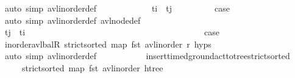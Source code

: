 \begin{isabellebody}
\ {\isacharparenleft}{\kern0pt}auto\ simp{\isacharcolon}{\kern0pt}\ avl{\isacharunderscore}{\kern0pt}inorder{\isacharunderscore}{\kern0pt}def{\isacharparenright}{\kern0pt}\isanewline
\ \ \ \ \isamarkupfalse%
\isanewline
\ \ \ \ \ \ \isamarkupfalse%
\ {\isachardoublequoteopen}t\isactrlsub i\ {\isacharequal}{\kern0pt}\ t\isactrlsub j{\isachardoublequoteclose}\isanewline
\ \ \ \ \ \ \isamarkupfalse%
\ \isamarkupfalse%
\ {\isacharquery}{\kern0pt}case\isanewline
\ \ \ \ \ \ \ \ \isamarkupfalse%
\ {\isacharparenleft}{\kern0pt}auto\ simp{\isacharcolon}{\kern0pt}\ avl{\isacharunderscore}{\kern0pt}inorder{\isacharunderscore}{\kern0pt}def\ avl{\isacharunderscore}{\kern0pt}node{\isacharunderscore}{\kern0pt}def{\isacharparenright}{\kern0pt}\isanewline
\ \ \ \ \isamarkupfalse%
\isanewline
\ \ \ \ \ \ \isamarkupfalse%
\ {\isachardoublequoteopen}t\isactrlsub j\ {\isacharless}{\kern0pt}\ t\isactrlsub i{\isachardoublequoteclose}\ \ \ \ \ \ \ \ \ \ \ \ \ \ \ \ \ \ \ \ \ \ \ \ \ \ \ \ \ \ \ \ \isanewline
\ \ \ \ \ \ \isamarkupfalse%
\ \isamarkupfalse%
\ {\isacharquery}{\kern0pt}case\isanewline
\ \ \ \ \ \ \ \ \isamarkupfalse%
\ inorder{\isacharunderscore}{\kern0pt}avl{\isacharunderscore}{\kern0pt}balR\ {\isacartoucheopen}strict{\isacharunderscore}{\kern0pt}sorted\ {\isacharparenleft}{\kern0pt}map\ fst\ {\isacharparenleft}{\kern0pt}avl{\isacharunderscore}{\kern0pt}inorder\ r{\isacharparenright}{\kern0pt}{\isacharparenright}{\kern0pt}{\isacartoucheclose}\ {\isachardoublequoteopen}{}{\isachardot}{\kern0pt}hyps{\isachardoublequoteclose}\ \isamarkupfalse%
\ {\isacharparenleft}{\kern0pt}auto\ simp{\isacharcolon}{\kern0pt}\ avl{\isacharunderscore}{\kern0pt}inorder{\isacharunderscore}{\kern0pt}def{\isacharparenright}{\kern0pt}\isanewline
\ \ \ \ \isamarkupfalse%
\isanewline
\ \ \isamarkupfalse%
%
\endisatagproof
{\isafoldproof}%
%
\isadelimproof
\isanewline
%
\endisadelimproof
\isanewline
\ \ \isamarkupfalse%
\ insert{\isacharunderscore}{\kern0pt}timed{\isacharunderscore}{\kern0pt}ground{\isacharunderscore}{\kern0pt}act{\isacharunderscore}{\kern0pt}to{\isacharunderscore}{\kern0pt}tree{\isacharunderscore}{\kern0pt}strict{\isacharunderscore}{\kern0pt}sorted{\isacharcolon}{\kern0pt}\ \isanewline
\ \ \ \ \ {\isachardoublequoteopen}strict{\isacharunderscore}{\kern0pt}sorted\ {\isacharparenleft}{\kern0pt}map\ fst\ {\isacharparenleft}{\kern0pt}avl{\isacharunderscore}{\kern0pt}inorder\ htree{\isacharparenright}{\kern0pt}{\isacharparenright}{\kern0pt}{\isachardoublequoteclose}\isanewline

\end{isabellebody}
